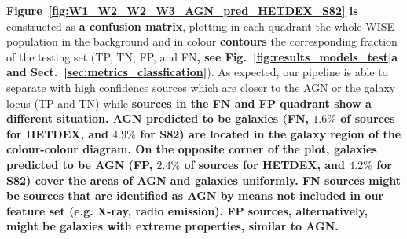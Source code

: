 \documentclass{aa}
\begin{document}
\textbf{Figure~\ref{fig:W1_W2_W2_W3_AGN_pred_HETDEX_S82} is} constructed as \textbf{a confusion matrix}, plotting in each quadrant the whole WISE population in the background and in colour \textbf{contours} the corresponding fraction of the testing set (TP, TN, FP, and FN\textbf{, see Fig.~\ref{fig:results_models_test}a and Sect.~\ref{sec:metrics_classfication}}). As expected, our pipeline is able to separate with high confidence sources which are closer to the AGN or the galaxy locus (TP and TN) while \textbf{sources in the FN and FP quadrant show a different situation. AGN predicted to be galaxies (FN, $1.6\%$ of sources for HETDEX, and $4.9\%$ for S82) are located in the galaxy region of the colour-colour diagram. On the opposite corner of the plot, galaxies predicted to be AGN (FP, $2.4\%$ of sources for HETDEX, and $4.2\%$ for S82) cover the areas of AGN and galaxies uniformly. FN sources might be sources that are identified as AGN by means not included in our feature set (e.g. X-ray, radio emission). FP sources, alternatively, might be galaxies with extreme properties, similar to AGN.}
\end{document}
